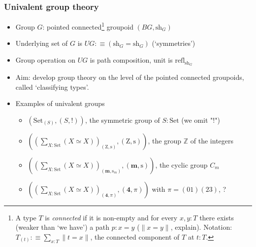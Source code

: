 \documentclass[handout,11pt]{beamer}
\newcommand{\Zet}{\mathrm{Z}}
\newcommand{\ZZ}{\mathbb{Z}}
\newcommand{\defeq}{:\equiv}
\newcommand{\sh}{\mathrm{sh}}
\newcommand{\refl}{\mathrm{refl}}
\newcommand{\Set}{\mathrm{Set}}
\newcommand{\Trunc}[1]{{\lVert}#1{\rVert}} %
\newcommand{\Ss}{\mathrm{s}}
\begin{document}
\begin{frame}
\frametitle{Univalent group theory}
 \begin{itemize}[<+->]
\item Group $G$: pointed connected\footnote{%
A type $T$ is \emph{connected} if it is non-empty and for every
$x,y:T$ there exists (weaker than `we have') a path $p:x =y$
($\Trunc{x=y}$, explain). Notation: $T_{(t)} \defeq \sum_{x:T}\Trunc{t=x}$, 
the connected component of $T$ at $t:T$.}
groupoid $(BG,\sh_G)$
\item Underlying set of $G$ is $UG \defeq (\sh_G  = \sh_G)$ (`symmetries')
\item Group operation on $UG$ is path composition, unit is $\refl_{\sh_G}$
\item Aim: develop group theory on the level of the pointed connected groupoids,
called `classifying types'.
\item Examples of univalent groups
 \begin{itemize}[<+->]
\item $(\Set_{(S)},(S,!))$, the symmetric group of $S:\Set$ (we omit "!")
\item $((\sum_{X:\Set}(X\simeq X))_{(\Zet,\Ss)},(\Zet,\Ss))$, 
the group $\ZZ$ of the integers
\item $((\sum_{X:\Set}(X\simeq X))_{(\mathbf{m},\Ss_m)},(\mathbf{m},\Ss))$,
the cyclic group $C_m$ %
\item $((\sum_{X:\Set}(X\simeq X))_{(\mathbf{4},\pi)},(\mathbf{4},\pi))$ 
with $\pi=(01)(23)$, ?
\end{itemize}
\end{itemize}
\end{frame}
\end{document}
